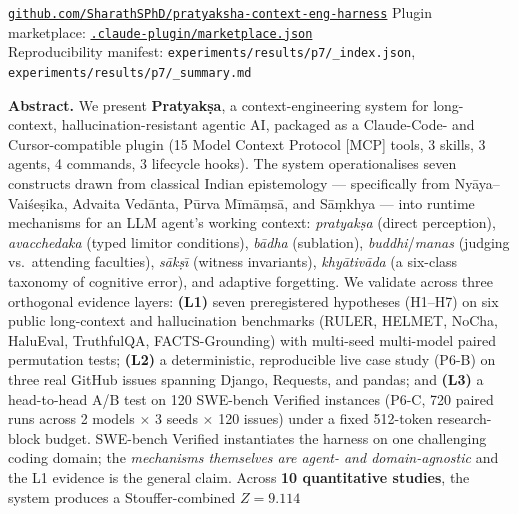 \begin{center}
\small
\href{https://github.com/SharathSPhD/pratyaksha-context-eng-harness}{\texttt{github.com/SharathSPhD/pratyaksha-context-eng-harness}} \quad\textbar\quad
Plugin marketplace: \href{https://github.com/SharathSPhD/pratyaksha-context-eng-harness/blob/main/.claude-plugin/marketplace.json}{\texttt{.claude-plugin/marketplace.json}} \\
Reproducibility manifest: \texttt{experiments/results/p7/\_index.json}, \texttt{experiments/results/p7/\_summary.md}
\end{center}

\vspace{-0.4em}
\begin{tcolorbox}[colback=gray!4,colframe=gray!50,boxrule=0.4pt,arc=2pt,
left=8pt,right=8pt,top=4pt,bottom=4pt]
\textbf{Abstract.}
We present \textbf{Pratyak\d{s}a}, a context-engineering system for
long-context, hallucination-resistant agentic AI, packaged as a
Claude-Code- and Cursor-compatible plugin
(15 Model Context Protocol [MCP] tools, 3 skills, 3 agents,
4 commands, 3 lifecycle hooks). The system operationalises seven
constructs drawn from classical Indian epistemology --- specifically from
Ny\=aya--Vai\'se\d{s}ika, Advaita Ved\=anta, P\=urva M\=im\=a\d{m}s\=a,
and S\=a\d{m}khya --- into runtime mechanisms for an LLM agent's working
context: \textit{pratyak\d{s}a} (direct perception),
\textit{avacchedaka} (typed limitor conditions),
\textit{b\=adha} (sublation), \textit{buddhi}/\textit{manas}
(judging vs.\ attending faculties), \textit{s\=ak\d{s}\=\i} (witness
invariants), \textit{khy\=ativ\=ada} (a six-class taxonomy of cognitive
error), and adaptive forgetting. We validate across three orthogonal
evidence layers: \textbf{(L1)} seven preregistered hypotheses
(H1--H7) on six public long-context and hallucination benchmarks
(RULER, HELMET, NoCha, HaluEval, TruthfulQA, FACTS-Grounding) with
multi-seed multi-model paired permutation tests; \textbf{(L2)} a
deterministic, reproducible live case study (P6-B) on three real
GitHub issues spanning Django, Requests, and pandas; and \textbf{(L3)}
a head-to-head A/B test on 120 SWE-bench Verified instances (P6-C,
720 paired runs across 2 models $\times$ 3 seeds $\times$ 120 issues)
under a fixed 512-token research-block budget. SWE-bench Verified
instantiates the harness on one challenging coding domain; the
\emph{mechanisms themselves are agent- and domain-agnostic} and the
L1 evidence is the general claim. Across \textbf{10 quantitative
studies}, the system produces a Stouffer-combined $Z = \mathbf{9.114}$

\end{tcolorbox}
